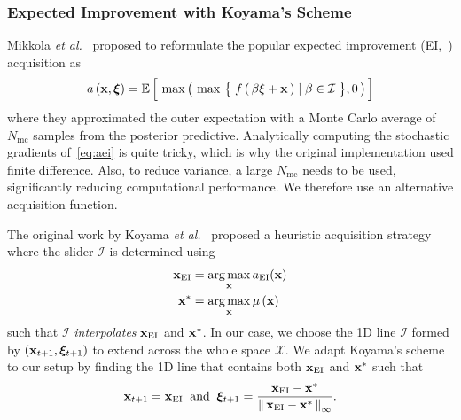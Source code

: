 \subsubsection{Expected Improvement with Koyama's Scheme}
Mikkola \textit{et al.}~\cite{10.1145/3072959.3073598} proposed to reformulate the popular expected improvement (EI,~\cite{jones_efficient_1998}) acquisition as
\begin{align}
  a\,(\mathbf{x}, \bm{\xi})
  = \mathbb{E}\,\Big[\, \max\big(\, \max\,\big\{\; f\,(\,\beta \xi + \mathbf{x}\,) \mid \beta \in \mathcal{I} \;\big\}, 0 \,\big)\,\Big]\label{eq:aei}
\end{align}
where they approximated the outer expectation with a Monte Carlo average of \(N_{\text{mc}}\) samples from the posterior predictive.
Analytically computing the stochastic gradients of~\cref{eq:aei} is quite tricky, which is why the original implementation used finite difference.
Also, to reduce variance, a large \(N_{\text{mc}}\) needs to be used, significantly reducing computational performance.
We therefore use an alternative acquisition function.

The original work by Koyama \textit{et al.}~\cite{koyama_sequential_2020} proposed a heuristic acquisition strategy where the slider \(\mathcal{I}\) is determined using
\begin{align}
  \mathbf{x}_{\mathrm{EI}}   &= \operatorname*{arg\,max}_{\mathbf{x}} a_{\mathrm{EI}}(\mathbf{x}) \label{eq:koyama_ei} \\
  \mathbf{x}^*   &= \operatorname*{arg\,max}_{\mathbf{x}} \mu\,(\mathbf{x}) \label{eq:koyama_opt}
\end{align}
such that \(\mathcal{I}\) \textit{interpolates} \(\mathbf{x}_{\mathrm{EI}}\) and \(\mathbf{x}^*\).
In our case, we choose the 1D line \(\mathcal{I}\) formed by \((\mathbf{x}_{t+1}, \bm{\xi}_{t+1})\) to extend across the whole space \(\mathcal{X}\).
We adapt Koyama's scheme to our setup by finding the 1D line that contains both \(\mathbf{x}_{\mathrm{EI}}\) and \(\mathbf{x}^*\) such that
\begin{align}
  \mathbf{x}_{t+1}   = \mathbf{x}_{\mathrm{EI}}\;\; \text{and} \;\;
  \bm{\xi}_{t+1} = \frac{\mathbf{x}_{\mathrm{EI}} - \mathbf{x}^*}{\left\lVert\,  \mathbf{x}_{\mathrm{EI}} - \mathbf{x}^*  \,\right\rVert_{\infty}}.\label{eq:xi_proj}
\end{align}

